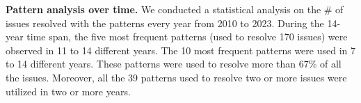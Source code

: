 













\textbf{Pattern analysis over time.}
We conducted a statistical analysis on the \# of issues resolved with the patterns every year from 2010 to 2023. During the 14-year time span, the five most frequent patterns (used to resolve 170 issues) were observed in 11 to 14 different years. The 10 most frequent patterns were used in 7 to 14 different years. These patterns were used to resolve more than 67\% of all the issues. Moreover, all the 39 patterns used to resolve two or more issues were utilized in two or more years.  









































































